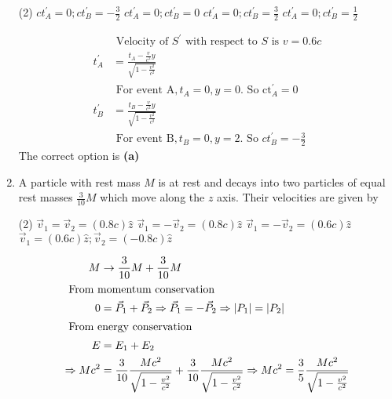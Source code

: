 \begin{enumerate}
	{}
\begin{tasks}(2)
	\task[\textbf{A.}] $c t_{A}^{\prime}=0 ; c t_{B}^{\prime}=-\frac{3}{2}$
	\task[\textbf{B.}]$c t_{A}^{\prime}=0 ; c t_{B}^{\prime}=0$
	\task[\textbf{C.}]$c t_{A}^{\prime}=0 ; c t_{B}^{\prime}=\frac{3}{2}$
	\task[\textbf{D.}] $c t_{A}^{\prime}=0 ; c t_{B}^{\prime}=\frac{1}{2}$
\end{tasks}
\begin{answer}
\begin{align*}
&\text { Velocity of } S^{\prime} \text { with respect to } S \text { is } v=0.6 c\\
t_{A}^{\prime}&=\frac{t_{A}-\frac{v}{c^{2}} y}{\sqrt{1-\frac{v^{2}}{c^{2}}}}\\
&\text { For event } \mathrm{A}, t_{A}=0, y=0 \text {. So } \mathrm{ct}_{A}^{\prime}=0\\
t_{B}^{\prime}&=\frac{t_{B}-\frac{v}{c^{2}} y}{\sqrt{1-\frac{v^{2}}{c^{2}}}}\\
&\text { For event } \mathrm{B}, t_{B}=0, y=2 \text {. So } c t_{B}^{\prime}=-\frac{3}{2}
\end{align*}
The correct option is \textbf{(a)}
\end{answer}
	\item A particle with rest mass $M$ is at rest and decays into two particles of equal rest masses $\frac{3}{10} M$ which move along the $z$ axis. Their velocities are given by
	{}
\begin{tasks}(2)
	\task[\textbf{A.}] $\vec{v}_{1}=\vec{v}_{2}=(0.8 c) \hat{z}$
	\task[\textbf{B.}]$\vec{v}_{1}=-\vec{v}_{2}=(0.8 c) \hat{z}$
	\task[\textbf{C.}]$\vec{v}_{1}=-\vec{v}_{2}=(0.6 c) \hat{z}$
	\task[\textbf{D.}]$\vec{v}_{1}=(0.6 c) \hat{z} ; \vec{v}_{2}=(-0.8 c) \hat{z}$
\end{tasks}
\begin{answer}
	\begin{align*}
	M &\rightarrow \frac{3}{10} M+\frac{3}{10} M\\
	\intertext { From momentum conservation }
	0&=\vec{P}_{1}+\vec{P}_{2} \Rightarrow \vec{P}_{1}=-\vec{P}_{2} \Rightarrow\left|P_{1}\right|=\left|P_{2}\right|\\
	\intertext { From energy conservation }
	E&=E_{1}+E_{2}\\
	\Rightarrow M c^{2}&=\frac{3}{10} \frac{M c^{2}}{\sqrt{1-\frac{v^{2}}{c^{2}}}}+\frac{3}{10} \frac{M c^{2}}{\sqrt{1-\frac{v^{2}}{c^{2}}}} \Rightarrow M c^{2}=\frac{3}{5} \frac{M c^{2}}{\sqrt{1-\frac{v^{2}}{c^{2}}}}\\

\end{align*}
\end{answer}
\end{enumerate}
